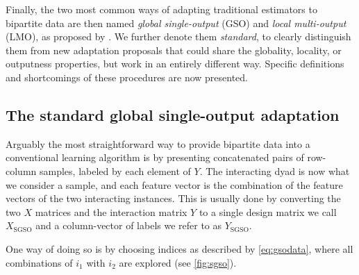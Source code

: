 Finally, the two most common ways of adapting traditional estimators to bipartite data are then named \emph{global single-output} (GSO) and \emph{local multi-output} (LMO), as proposed by . We further denote them \emph{standard}, to clearly distinguish them from new adaptation proposals that could share the globality, locality, or outputness properties, but work in an entirely different way.
%
Specific definitions and shortcomings of these procedures are now presented.


\subsection{The standard global single-output adaptation}
\label{sec:sgso}

Arguably the most straightforward way to provide bipartite data into a conventional learning algorithm 
is by presenting concatenated pairs of row-column samples, labeled by each element of $Y$.
%
The interacting dyad is now what we consider a sample, and each feature vector is the combination of the feature vectors of the two interacting instances.
This is usually done by converting the two $X$ matrices and the
interaction matrix $Y$ to a single design matrix we call $X_\text{SGSO}$ and a column-vector of labels we refer to as $Y_\text{SGSO}$.

One way of doing so is by choosing indices as described by \autoref{eq:gsodata}, where
all combinations of $i_1$ with $i_2$ are explored (see \autoref{fig:sgso}).

